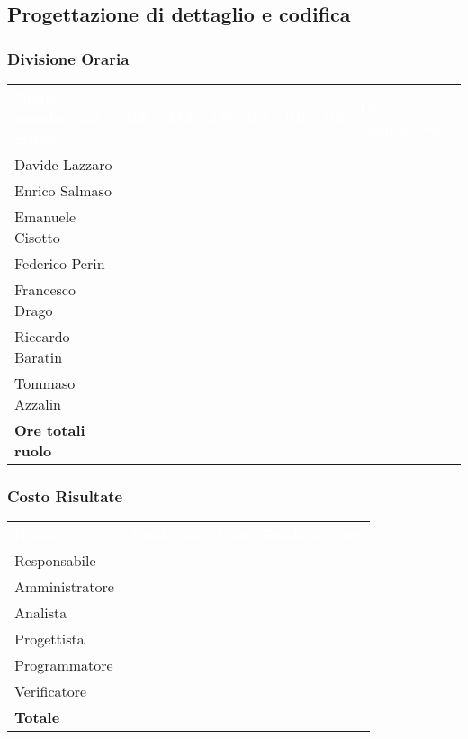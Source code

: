 \subsection{Progettazione di dettaglio e codifica}

\subsubsection{Divisione Oraria}
{
	\renewcommand{\arraystretch}{2}
	\centering
	\begin{longtable}{ C{5cm} C{1cm} C{1cm} C{1cm} C{1cm} C{1cm} C{1cm} C{3cm}}
		\textcolor{white}{\textbf{Nome membro del gruppo}} & \textcolor{white}{\textbf{RE}} & \textcolor{white}{\textbf{AM}} & \textcolor{white}{\textbf{AN}} & \textcolor{white}{\textbf{PT}} & \textcolor{white}{\textbf{PR}} & \textcolor{white}{\textbf{VE}} & \textcolor{white}{\textbf{Ore complessive}}\\	
        
        Davide Lazzaro & & & & & & & \\
        Enrico Salmaso & & & & & & & \\
        Emanuele Cisotto & & & & & & & \\
        Federico Perin & & & & & & & \\
        Francesco Drago & & & & & & & \\
        Riccardo Baratin & & & & & & & \\
        Tommaso Azzalin & & & & & & & \\
        \textbf{Ore totali ruolo} & & & & & & & \\
		
	\end{longtable}
}

\subsubsection{Costo Risultate}
{
	\renewcommand{\arraystretch}{2}
	\centering
	\begin{longtable}{ C{3cm} C{2cm} C{4cm}}
		\textcolor{white}{\textbf{Ruolo}} & \textcolor{white}{\textbf{Totale ore}} & \textcolor{white}{\textbf{Costo Ruolo in euro}}\\	
        
        Responsabile & & \\
        Amministratore & & \\
        Analista & & \\
        Progettista & & \\
        Programmatore & & \\
        Verificatore & & \\
        \textbf{Totale} & & \\
		
	\end{longtable}
}

